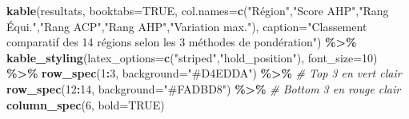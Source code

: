 \documentclass[
]{article}
\newenvironment{Shaded}{\begin{snugshade}}{\end{snugshade}}
\newcommand{\AttributeTok}[1]{\textcolor[rgb]{0.13,0.29,0.53}{#1}}
\newcommand{\CommentTok}[1]{\textcolor[rgb]{0.56,0.35,0.01}{\textit{#1}}}
\newcommand{\ConstantTok}[1]{\textcolor[rgb]{0.56,0.35,0.01}{#1}}
\newcommand{\DecValTok}[1]{\textcolor[rgb]{0.00,0.00,0.81}{#1}}
\newcommand{\FunctionTok}[1]{\textcolor[rgb]{0.13,0.29,0.53}{\textbf{#1}}}
\newcommand{\NormalTok}[1]{#1}
\newcommand{\SpecialCharTok}[1]{\textcolor[rgb]{0.81,0.36,0.00}{\textbf{#1}}}
\newcommand{\StringTok}[1]{\textcolor[rgb]{0.31,0.60,0.02}{#1}}
\begin{document}
\begin{Shaded}
\begin{Highlighting}[]
\FunctionTok{kable}\NormalTok{(resultats, }\AttributeTok{booktabs=}\ConstantTok{TRUE}\NormalTok{,}
      \AttributeTok{col.names=}\FunctionTok{c}\NormalTok{(}\StringTok{"Région"}\NormalTok{,}\StringTok{"Score AHP"}\NormalTok{,}\StringTok{"Rang Équi."}\NormalTok{,}\StringTok{"Rang ACP"}\NormalTok{,}\StringTok{"Rang AHP"}\NormalTok{,}\StringTok{"Variation max."}\NormalTok{),}
      \AttributeTok{caption=}\StringTok{"Classement comparatif des 14 régions selon les 3 méthodes de pondération"}\NormalTok{) }\SpecialCharTok{\%\textgreater{}\%}
  \FunctionTok{kable\_styling}\NormalTok{(}\AttributeTok{latex\_options=}\FunctionTok{c}\NormalTok{(}\StringTok{"striped"}\NormalTok{,}\StringTok{"hold\_position"}\NormalTok{), }\AttributeTok{font\_size=}\DecValTok{10}\NormalTok{) }\SpecialCharTok{\%\textgreater{}\%}
  \FunctionTok{row\_spec}\NormalTok{(}\DecValTok{1}\SpecialCharTok{:}\DecValTok{3}\NormalTok{, }\AttributeTok{background=}\StringTok{"\#D4EDDA"}\NormalTok{) }\SpecialCharTok{\%\textgreater{}\%}        \CommentTok{\# Top 3 en vert clair}
  \FunctionTok{row\_spec}\NormalTok{(}\DecValTok{12}\SpecialCharTok{:}\DecValTok{14}\NormalTok{, }\AttributeTok{background=}\StringTok{"\#FADBD8"}\NormalTok{) }\SpecialCharTok{\%\textgreater{}\%}      \CommentTok{\# Bottom 3 en rouge clair}
  \FunctionTok{column\_spec}\NormalTok{(}\DecValTok{6}\NormalTok{, }\AttributeTok{bold=}\ConstantTok{TRUE}\NormalTok{)}
\end{Highlighting}
\end{Shaded}

\begingroup\fontsize{10}{12}\selectfont
\end{document}
